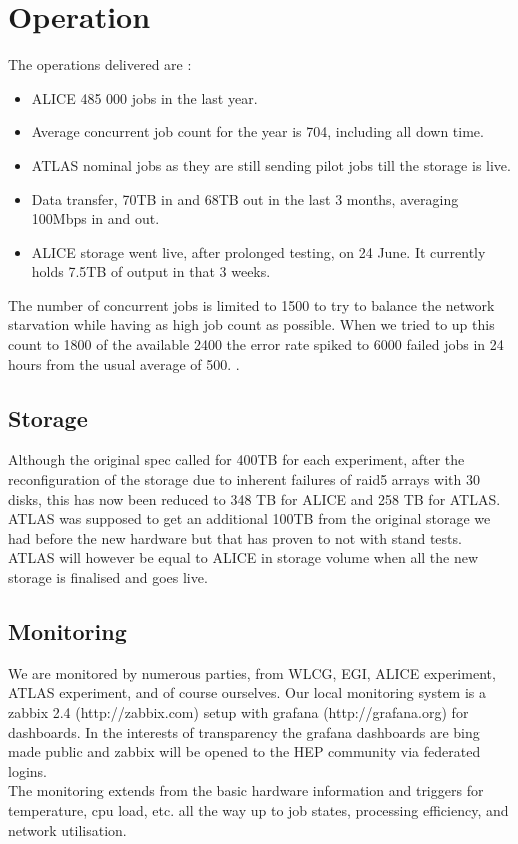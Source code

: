 \documentclass[a4paper]{jpconf}
\begin{document}
\section{Operation}
The operations delivered are :
\begin{itemize}
  \item ALICE 485 000 jobs in the last year.
  \item Average concurrent job count for the year is 704, including all down time.
  \item ATLAS nominal jobs as they are still sending pilot jobs till the storage is live.
  \item Data transfer, 70TB in and 68TB out in the last 3 months, averaging 100Mbps in and out.
  \item ALICE storage went live, after prolonged testing, on 24 June. It currently holds 7.5TB of output in that 3 weeks.
\end{itemize}
The number of concurrent jobs is limited to 1500 to try to balance the network 
starvation while having as high job count as possible. When we tried to up this count to 1800 of the available 2400 the error rate spiked to 6000 failed jobs in 24 hours
from the usual average of 500.
.

\subsection{Storage}
Although the original spec called for 400TB for each experiment, after the reconfiguration of the storage due to 
inherent failures of raid5 arrays with 30 disks, this has now been reduced to 348 TB for ALICE and 258 TB for ATLAS.
ATLAS was supposed to get an additional 100TB from the original storage we had before the new hardware but that has 
proven to not with stand tests. ATLAS will however be equal to ALICE in storage volume when all the new storage 
is finalised and goes live.

\subsection{Monitoring}
We are monitored by numerous parties, from WLCG, EGI, ALICE experiment, ATLAS experiment, and of course
ourselves. Our local monitoring system is a zabbix 2.4 (http://zabbix.com) setup with grafana (http://grafana.org) for dashboards. In the interests of transparency
the grafana dashboards are bing made public and zabbix will be opened to the HEP community via federated logins.\\
The monitoring extends from the basic hardware information and triggers for temperature, cpu load, etc. all the way up to 
job states,  processing efficiency, and network utilisation.
\end{document}
